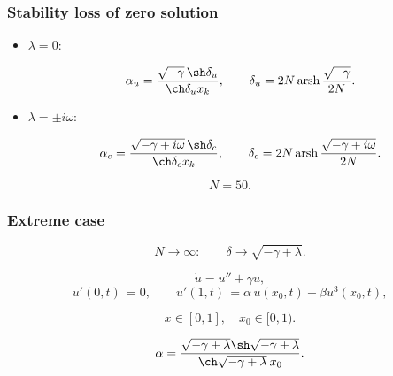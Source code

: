\documentclass[fullscreen=true, unicode, bookmarks=false]{beamer}
\DeclareMathOperator{\arsh}{arsh}
\begin{document}
\begin{frame}
\frametitle{ Stability loss of zero solution }

\begin{itemize}

\item { $ \lambda = 0: $ 
}

$$ \alpha_u = \frac{ \sqrt{-\gamma} \, \sh \delta_u }{ \ch\delta_u x_k }, \qquad \delta_u = 2N \arsh \dfrac{\sqrt{-\gamma}}{2N}. $$

\medskip
\pause

\item { $ \lambda = \pm i \omega: \; $ 
}

$$ \alpha_c = \frac{ \sqrt{-\gamma + i \omega} \, \sh \delta_c }{ \ch\delta_c x_k }, \qquad \delta_c = 2N \arsh \dfrac{\sqrt{-\gamma + i \omega}}{2N}. $$

\end{itemize}

\bigskip
\pause

$$ N = 50. $$	

\end{frame}

\begin{frame}
\frametitle{ Extreme case }

$$ N \rightarrow \infty: \qquad \delta \rightarrow \sqrt{-\gamma + \lambda}. $$

\bigskip
\pause

\begin{equation}
	\dot u = u'' + \gamma u,	
\end{equation}
\begin{equation}
	u'(0, t) \, = 0, \qquad u'(1, t) \, = \alpha\,u(x_0, t) + \beta u^3(x_0, t),
\end{equation}

\smallskip

$$ x \in [0,1] ,\quad  x_0 \in [0, 1). $$

\bigskip
\pause

\begin{equation}
\alpha = \dfrac{\sqrt{-\gamma+\lambda}\sh\sqrt{-\gamma+\lambda}}{\ch\sqrt{-\gamma+\lambda}\:x_0}.
\end{equation}

\end{frame}
\end{document}
